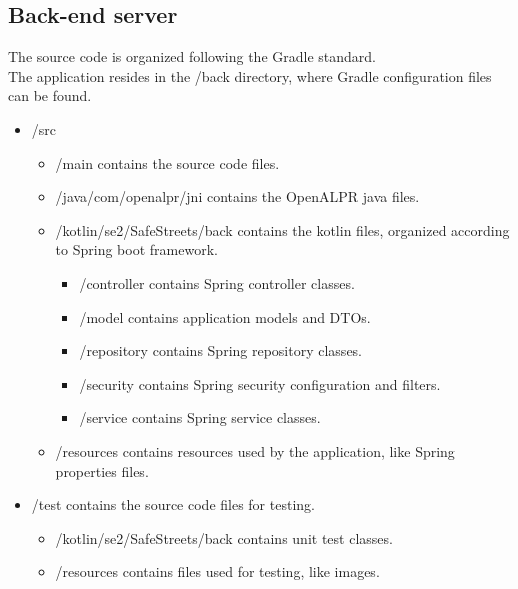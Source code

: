 \subsection{Back-end server}
The source code is organized following the Gradle standard.\\

The application resides in the /back directory, where Gradle configuration files can be found.

\begin{itemize}
    \item 
    /src
    \begin{itemize}[label={$\diamond$}]
        \item 
        /main \textcolor{black!70}{contains the source code files.}
        \item 
        /java/com/openalpr/jni \textcolor{black!70}{contains the OpenALPR java files.}
        \item 
        /kotlin/se2/SafeStreets/back \textcolor{black!70}{contains the kotlin files, organized according to Spring boot framework.}
        \begin{itemize}[label={\textbf{-}}]
            \item 
            /controller \textcolor{black!70}{contains Spring controller classes.}
            \item 
            /model \textcolor{black!70}{contains application models and DTOs.}
            \item 
            /repository \textcolor{black!70}{contains Spring repository classes.}
            \item 
            /security \textcolor{black!70}{contains Spring security configuration and filters.}
            \item 
            /service \textcolor{black!70}{contains Spring service classes.}
        \end{itemize}
        \item 
        /resources \textcolor{black!70}{contains resources used by the application, like Spring properties files.}
    \end{itemize}

    \item 
    /test \textcolor{black!70}{contains the source code files for testing.}
    \begin{itemize}[label={$\diamond$}]
        \item 
        /kotlin/se2/SafeStreets/back \textcolor{black!70}{contains unit test classes.}
        \item 
        /resources \textcolor{black!70}{contains files used for testing, like images.}
    \end{itemize}
\end{itemize}

